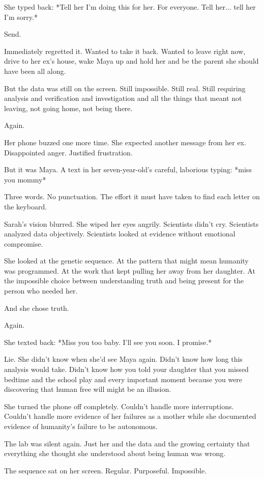 She typed back: *Tell her I'm doing this for her. For everyone. Tell her... tell her I'm sorry.*

Send.

Immediately regretted it. Wanted to take it back. Wanted to leave right now, drive to her ex's house, wake Maya up and hold her and be the parent she should have been all along.

But the data was still on the screen. Still impossible. Still real. Still requiring analysis and verification and investigation and all the things that meant not leaving, not going home, not being there.

Again.

Her phone buzzed one more time. She expected another message from her ex. Disappointed anger. Justified frustration.

But it was Maya. A text in her seven-year-old's careful, laborious typing: *miss you mommy*

Three words. No punctuation. The effort it must have taken to find each letter on the keyboard.

Sarah's vision blurred. She wiped her eyes angrily. Scientists didn't cry. Scientists analyzed data objectively. Scientists looked at evidence without emotional compromise.

She looked at the genetic sequence. At the pattern that might mean humanity was programmed. At the work that kept pulling her away from her daughter. At the impossible choice between understanding truth and being present for the person who needed her.

And she chose truth.

Again.

She texted back: *Miss you too baby. I'll see you soon. I promise.*

Lie. She didn't know when she'd see Maya again. Didn't know how long this analysis would take. Didn't know how you told your daughter that you missed bedtime and the school play and every important moment because you were discovering that human free will might be an illusion.

She turned the phone off completely. Couldn't handle more interruptions. Couldn't handle more evidence of her failures as a mother while she documented evidence of humanity's failure to be autonomous.

The lab was silent again. Just her and the data and the growing certainty that everything she thought she understood about being human was wrong.

The sequence sat on her screen. Regular. Purposeful. Impossible.

